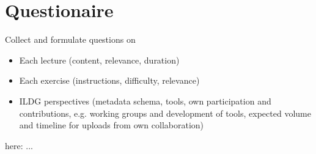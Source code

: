 \documentclass{article}
\begin{document}
\section{Questionaire}
Collect and formulate questions on
\begin{itemize}
    \item Each lecture (content, relevance, duration)
    \item Each exercise (instructions, difficulty, relevance)
    \item ILDG perspectives (metadata schema, tools, own participation and contributions, e.g. working groups and development of tools, expected volume and timeline for uploads from own collaboration) 
\end{itemize}
here:
...



\end{document}
